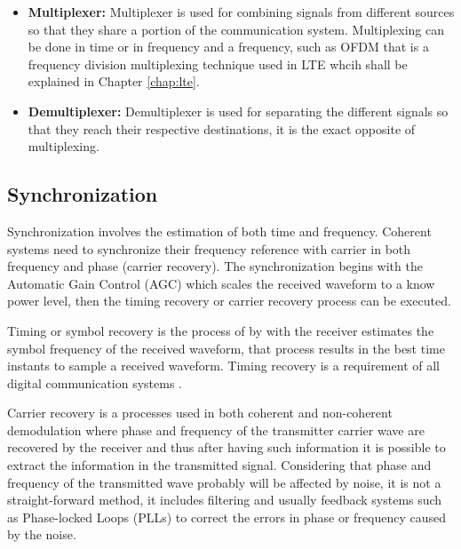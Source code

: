 \begin{itemize}

  \item \textbf{Multiplexer:} Multiplexer is used for combining signals from
  different sources so that they share a portion of the communication system.
  Multiplexing can be done in time or in frequency and a frequency, such as OFDM
  that is a frequency division multiplexing technique used in LTE whcih shall be
  explained in Chapter \ref{chap:lte}.

  \item \textbf{Demultiplexer:} Demultiplexer is used for separating the
  different signals so that they reach their respective destinations, it is the
  exact opposite of multiplexing.

\end{itemize}

\subsection{Synchronization}

Synchronization involves the estimation of both time and frequency. Coherent
systems need to synchronize their frequency reference with carrier in both
frequency and phase (carrier recovery). The synchronization begins with the
Automatic Gain Control (AGC) which scales the received waveform to a know power
level, then the timing recovery or carrier recovery process can be executed.

Timing or symbol recovery is the process of by with the receiver estimates the
symbol frequency of the received waveform, that process results in the best time
instants to sample a received waveform. Timing recovery is a requirement of all
digital communication systems \cite{akbook}.

Carrier recovery is a processes used in both coherent and non-coherent
demodulation where phase and frequency of the transmitter carrier wave are
recovered by the receiver and thus after having such information it is possible
to extract the information in the transmitted signal. Considering that phase and
frequency of the transmitted wave probably will be affected by noise, it is not
a straight-forward method, it includes filtering and usually feedback systems
such as Phase-locked Loops (PLLs) to correct the errors in phase or frequency
caused by the noise.
